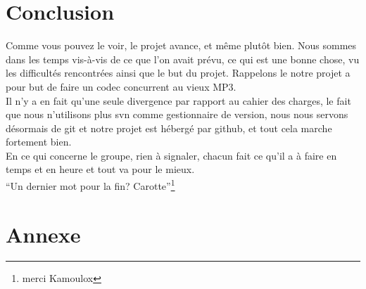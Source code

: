 \documentclass[a4paper,12pt]{article}
\begin{document}
\section*{Conclusion}
Comme vous pouvez le voir, le projet avance, et même plutôt bien. Nous sommes
dans les temps vis-à-vis de ce que l'on avait prévu, ce qui est une bonne chose,
vu les difficultés rencontrées ainsi que le but du projet. Rappelons le notre
projet a pour but de faire un codec concurrent au vieux MP3.\\
Il n'y a en fait qu'une seule divergence par rapport au cahier des charges, le
fait que nous n'utilisons plus svn comme gestionnaire de version, nous nous
servons désormais de git et notre projet est hébergé par github, et tout cela
marche fortement bien.\\
En ce qui concerne le groupe, rien à signaler, chacun fait ce qu'il a à faire en
temps et en heure et tout va pour le mieux.\\
``Un dernier mot pour la fin? Carotte''\footnote{merci Kamoulox}\\

\newpage

\section{Annexe}
\end{document}
